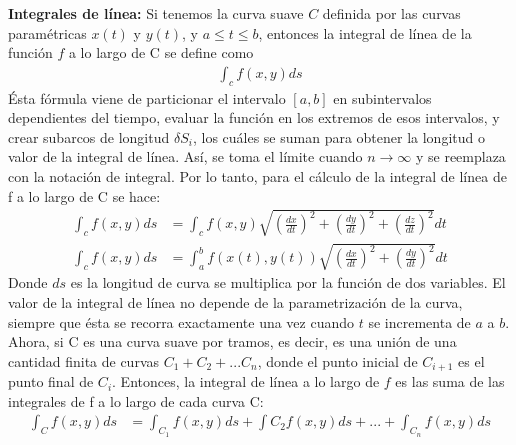 \documentclass[12pt, letterpaper]{report}
\begin{document}
\textbf{Integrales de línea: } Si tenemos la curva suave $C$ definida por las curvas paramétricas $x(t)$ y $y(t)$, y $a \leq t \leq b$, entonces la 
integral de línea de la función $f$ a lo largo de C se define como 
\begin{align}
\int_c f(x, y)ds
\end{align}Ésta fórmula viene de particionar el intervalo $[a, b]$ en subintervalos dependientes del tiempo, evaluar la función en los extremos de esos intervalos, 
y crear subarcos de longitud $\delta S_i$, los cuáles se suman para obtener la longitud o valor de la integral de línea. Así, se toma el límite cuando $n \rightarrow \infty$ y 
se reemplaza con la notación de integral. 
Por lo tanto, para el cálculo de la integral de línea de f a lo largo de C se hace: 
\begin{align}
\int_c f(x, y)ds &= \int_c f(x,y) \sqrt{(\frac{dx}{dt})^2+(\frac{dy}{dt})^2 + (\frac{dz}{dt})^2}dt\\
\int_c f(x, y)ds &= \int_{a}^{b}f(x(t), y(t)) \sqrt{(\frac{dx}{dt})^2 + (\frac{dy}{dt})^2}dt
\end{align}Donde $ds$ es la longitud de curva se multiplica por la función de dos variables. El valor de la integral de línea no depende de la parametrización de la curva, 
siempre que ésta se recorra exactamente una vez cuando $t$ se incrementa de $a$ a $b$. \\ 

Ahora, si C es una curva suave por tramos, es decir, es una unión de una cantidad finita de curvas $C_1 + C_2 + ... C_n$, donde el punto inicial de $C_{i+1}$ es el punto final de $C_i$. Entonces, 
la integral de línea a lo largo de $f$ es las suma de las integrales de f a lo largo de cada curva C: 
\begin{align}
\int_C f(x, y)ds &= \int_{C_1}f(x, y)ds + \int C_2 f(x, y)ds + ... + \int_{C_n} f(x, y)ds
\end{align}
\end{document}
